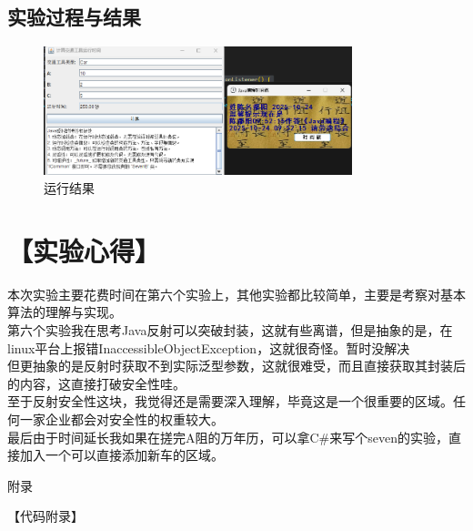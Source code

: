 \documentclass[12pt,a4paper]{article}
\begin{document}
\subsection*{实验过程与结果}

\begin{figure}[H]
\centering
\includegraphics[width=0.8\textwidth]{sevenb.png}
\caption{运行结果}
\end{figure}



\section*{【实验心得】}
    本次实验主要花费时间在第六个实验上，其他实验都比较简单，主要是考察对基本算法的理解与实现。\\
    
    第六个实验我在思考Java反射可以突破封装，这就有些离谱，但是抽象的是，在linux平台上报错InaccessibleObjectException，这就很奇怪。暂时没解决\\

    但更抽象的是反射时获取不到实际泛型参数，这就很难受，而且直接获取其封装后的内容，这直接打破安全性哇。\\

    至于反射安全性这块，我觉得还是需要深入理解，毕竟这是一个很重要的区域。任何一家企业都会对安全性的权重较大。\\

    最后由于时间延长我如果在搓完A阻的万年历，可以拿C\#来写个seven的实验，直接加入一个可以直接添加新车的区域。\\
\newpage
\begin{center}
    {\heiti 附录}
\end{center}
{【代码附录】}\\
\end{document}
